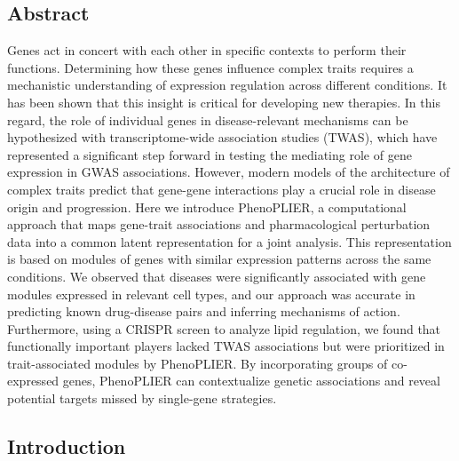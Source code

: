 \documentclass[
        11pt,
]{article}
\begin{document}
\hypertarget{abstract}{%
\subsection{Abstract}\label{abstract}}

Genes act in concert with each other in specific contexts to perform their functions.
Determining how these genes influence complex traits requires a mechanistic understanding of expression regulation across different conditions.
It has been shown that this insight is critical for developing new therapies.
In this regard, the role of individual genes in disease-relevant mechanisms can be hypothesized with transcriptome-wide association studies (TWAS), which have represented a significant step forward in testing the mediating role of gene expression in GWAS associations.
However, modern models of the architecture of complex traits predict that gene-gene interactions play a crucial role in disease origin and progression.
Here we introduce PhenoPLIER, a computational approach that maps gene-trait associations and pharmacological perturbation data into a common latent representation for a joint analysis.
This representation is based on modules of genes with similar expression patterns across the same conditions.
We observed that diseases were significantly associated with gene modules expressed in relevant cell types, and our approach was accurate in predicting known drug-disease pairs and inferring mechanisms of action.
Furthermore, using a CRISPR screen to analyze lipid regulation, we found that functionally important players lacked TWAS associations but were prioritized in trait-associated modules by PhenoPLIER.
By incorporating groups of co-expressed genes, PhenoPLIER can contextualize genetic associations and reveal potential targets missed by single-gene strategies.

\hypertarget{introduction}{%
\subsection{Introduction}\label{introduction}}
\end{document}

